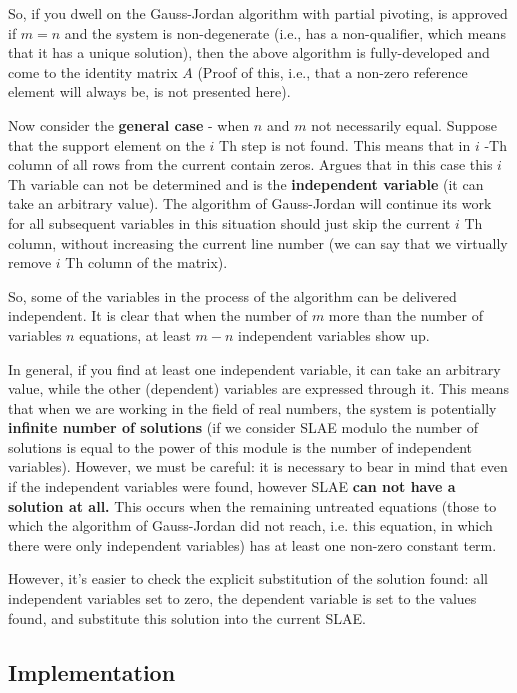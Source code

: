 So, if you dwell on the Gauss-Jordan algorithm with partial pivoting, is approved if $m = n$ and the system is non-degenerate (i.e., has a non-qualifier, which means that it has a unique solution), then the above algorithm is fully-developed and come to the identity matrix $A$ (Proof of this, i.e., that a non-zero reference element will always be, is not presented here).

Now consider the \textbf{general case} - when $n$ and $m$ not necessarily equal. Suppose that the support element on the $i$ Th step is not found. This means that in $i$ -Th column of all rows from the current contain zeros. Argues that in this case this $i$ Th variable can not be determined and is the \textbf{independent variable} (it can take an arbitrary value). The algorithm of Gauss-Jordan will continue its work for all subsequent variables in this situation should just skip the current $i$ Th column, without increasing the current line number (we can say that we virtually remove $i$ Th column of the matrix).

So, some of the variables in the process of the algorithm can be delivered independent. It is clear that when the number of $m$ more than the number of variables $n$ equations, at least $m-n$ independent variables show up.

In general, if you find at least one independent variable, it can take an arbitrary value, while the other (dependent) variables are expressed through it. This means that when we are working in the field of real numbers, the system is potentially \textbf{infinite number of solutions} (if we consider SLAE modulo the number of solutions is equal to the power of this module is the number of independent variables). However, we must be careful: it is necessary to bear in mind that even if the independent variables were found, however SLAE \textbf{can not have a solution at all.} This occurs when the remaining untreated equations (those to which the algorithm of Gauss-Jordan did not reach, i.e. this equation, in which there were only independent variables) has at least one non-zero constant term.

However, it's easier to check the explicit substitution of the solution found: all independent variables set to zero, the dependent variable is set to the values ​​found, and substitute this solution into the current SLAE.

\subsection{ Implementation }

